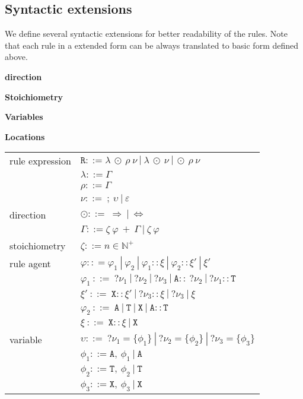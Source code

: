 \documentclass{entcs}
\renewcommand{\~}[0]{\texttildelow}
\begin{document}
\subsection{Syntactic extensions}

We define several syntactic extensions for better readability of the rules. Note that each rule in a extended form can be always translated to basic form defined above.

\textbf{direction}

\textbf{Stoichiometry}

\textbf{Variables}

\textbf{Locations}

\begin{center}
{\small
\hspace*{-1cm}\begin{tabular}{ l l }
 rule expression & $\mathtt{R} ::= \lambda ~\odot~ \rho~\nu ~|~ \lambda ~\odot~\nu ~|~ \odot~ \rho~\nu $\\
  & $\lambda ::= \Gamma$\\
  & $\rho ::= \Gamma$\\
  & $\nu ::=~ ;~\upsilon ~|~ \varepsilon$\\
 direction & $\odot ::=~ \Rightarrow~|~\Leftrightarrow $\\
  & $\Gamma ::= \zeta~\varphi~ +~\Gamma ~|~ \zeta~\varphi$\\
 stoichiometry & $\zeta ::= n \in \mathbb{N}^+$\\
 rule agent & $\varphi :: = \varphi_1~|~\varphi_2~|~\varphi_1::\xi~|~\varphi_2::\xi'~|~\xi'$\\
  & $\varphi_1  ~::=~  ?\nu_1~|~?\nu_2~|~?\nu_3~|~\mathtt{A}::~?\nu_2~|~?\nu_1::\mathtt{T}$\\
  & $\xi' ~::=~ \mathtt{X}::\xi'~|~?\nu_3::\xi~|~?\nu_3~|~\xi$\\
  & $\varphi_2  ~::=~  \mathtt{A}~|~\mathtt{T}~|~\mathtt{X}~|~\mathtt{A}::\mathtt{T}$\\
  & $\xi  ~::=~  \mathtt{X}::\xi~|~\mathtt{X}$\\
 variable & $\upsilon ::=~?\nu_1=\{\phi_1\}~|~?\nu_2=\{\phi_2\}~|~?\nu_3=\{\phi_3\}$\\
  & $\phi_1 ::= \mathtt{A},~\phi_1~|~\mathtt{A}$\\
  & $\phi_2 ::= \mathtt{T},~\phi_2~|~\mathtt{T}$\\
  & $\phi_3 ::= \mathtt{X},~\phi_3~|~\mathtt{X}$\\
\end{tabular}
}
\end{center}
\end{document}
